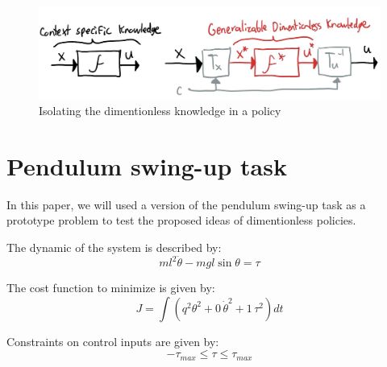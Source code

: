 \begin{figure}[t]
\vspace{-5pt}
\begin{center}
\includegraphics[width=0.99\linewidth]{fig/dimpol.jpg}
\caption{Isolating the dimentionless knowledge in a policy}\label{fig:dimpol}
\end{center}
\vspace{-15pt}
\end{figure}



 








\newpage
\section{Pendulum swing-up task}
In this paper, we will used a version of the pendulum swing-up task as a prototype problem to test the proposed ideas of dimentionless policies.

The dynamic of the system is described by:
\begin{equation}
ml^2 \ddot{\theta} - mgl \sin \theta = \tau
\end{equation}

The cost function to minimize is given by:
\begin{equation}
J = \int{( q^2 \theta^2 + 0 \, \dot{\theta}^2 + 1 \, \tau^2 ) dt }
\end{equation}

Constraints on control inputs are given by:
\begin{equation}
- \tau_{max} \leq \tau \leq \tau_{max}
\end{equation}

